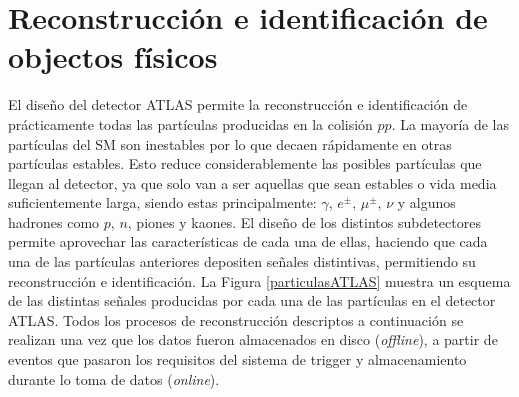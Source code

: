 \chapter{Reconstrucción e identificación de objectos físicos} %



El diseño del detector ATLAS permite la reconstrucción e identificación de prácticamente todas las
partículas producidas en la colisión $pp$. 
La mayoría de las partículas del SM son inestables por lo que decaen rápidamente en otras partículas estables. Esto reduce considerablemente las posibles partículas que llegan
al detector, ya que solo van a ser aquellas que sean estables o vida media suficientemente larga, siendo estas principalmente: $\gamma$, $e^{\pm}$, $\mu^{\pm}$, $\nu$ y algunos hadrones
como $p$, $n$, piones y kaones. El diseño de los distintos subdetectores permite aprovechar las
características de cada una de ellas, haciendo que cada una de las partículas anteriores depositen señales distintivas, permitiendo su reconstrucción e identificación. La Figura \ref{particulasATLAS} muestra un esquema de las distintas señales producidas por cada una de las partículas en el detector ATLAS. Todos los procesos de reconstrucción descriptos a continuación se realizan una vez que los datos fueron almacenados en disco (\textit{offline}), a partir de eventos que pasaron los requisitos del sistema de trigger y almacenamiento durante lo toma de datos (\textit{online}).





